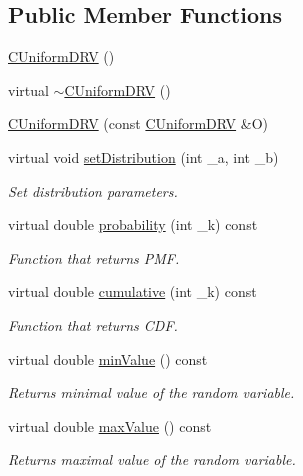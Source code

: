 \subsection*{Public Member Functions}
\begin{DoxyCompactItemize}
\item 
\hyperlink{class_c_uniform_d_r_v_a55cb9431fba570dcfb1e1e8840c3a30f}{C\-Uniform\-D\-R\-V} ()
\item 
virtual \hyperlink{class_c_uniform_d_r_v_a5e176427ef922d3b54108774f7a31a43}{$\sim$\-C\-Uniform\-D\-R\-V} ()
\item 
\hyperlink{class_c_uniform_d_r_v_a33ee9fc630c5b3a6974c1a67ebeb3e07}{C\-Uniform\-D\-R\-V} (const \hyperlink{class_c_uniform_d_r_v}{C\-Uniform\-D\-R\-V} \&O)
\item 
virtual void \hyperlink{class_c_uniform_d_r_v_a1649494e352ccd451fd63e9628203626}{set\-Distribution} (int \-\_\-a, int \-\_\-b)
\begin{DoxyCompactList}\small\item\em Set distribution parameters. \end{DoxyCompactList}\item 
virtual double \hyperlink{class_c_uniform_d_r_v_a6ca68e947812236e050b648966899339}{probability} (int \-\_\-k) const 
\begin{DoxyCompactList}\small\item\em Function that returns P\-M\-F. \end{DoxyCompactList}\item 
virtual double \hyperlink{class_c_uniform_d_r_v_a8fbd47fb7dc53e172374913f42074078}{cumulative} (int \-\_\-k) const 
\begin{DoxyCompactList}\small\item\em Function that returns C\-D\-F. \end{DoxyCompactList}\item 
virtual double \hyperlink{class_c_uniform_d_r_v_acfc4ae15c3f8376d09c359f5a9c77042}{min\-Value} () const 
\begin{DoxyCompactList}\small\item\em Returns minimal value of the random variable. \end{DoxyCompactList}\item 
virtual double \hyperlink{class_c_uniform_d_r_v_afb4394d6a7e10ea356974fa29c936865}{max\-Value} () const 
\begin{DoxyCompactList}\small\item\em Returns maximal value of the random variable. \end{DoxyCompactList}\item 

\end{DoxyCompactItemize}
